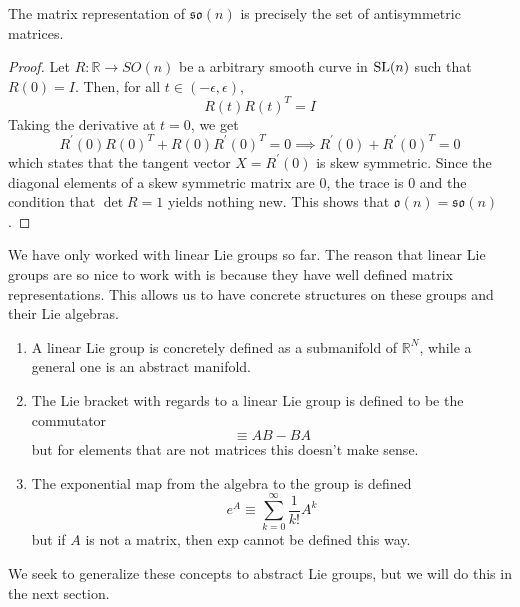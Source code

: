   \begin{theorem}
    The matrix representation of $\mathfrak{so}(n)$ is precisely the set of antisymmetric matrices. 
  \end{theorem}
  \begin{proof}
    Let $R: \mathbb{R} \rightarrow SO(n)$ be a arbitrary smooth curve in $\operatorname{SL}(n)$ such that $R(0) = I$. Then, for all $t \in (-\epsilon, \epsilon)$, 
    \begin{equation}
      R(t) R(t)^T = I
    \end{equation}
    Taking the derivative at $t = 0$, we get
    \begin{equation}
      R^\prime (0) R(0)^T + R(0) R^\prime(0)^T = 0 \implies R^\prime (0) + R^\prime(0)^T = 0
    \end{equation}
    which states that the tangent vector $X = R^\prime (0)$ is skew symmetric. Since the diagonal elements of a skew symmetric matrix are $0$, the trace is $0$ and the condition that $\det{R} = 1$ yields nothing new. This shows that $\mathfrak{o}(n) = \mathfrak{so}(n)$. 
  \end{proof}




  We have only worked with linear Lie groups so far. The reason that linear Lie groups are so nice to work with is because they have well defined matrix representations. This allows us to have concrete structures on these groups and their Lie algebras. 
  \begin{enumerate}
    \item A linear Lie group is concretely defined as a submanifold of $\mathbb{R}^N$, while a general one is an abstract manifold. 
    \item The Lie bracket with regards to a linear Lie group is defined to be the commutator 
      \begin{equation}
        [A,B] \equiv A B - B A
      \end{equation}
    but for elements that are not matrices this doesn't make sense. 

    \item The exponential map from the algebra to the group is defined
      \begin{equation}
        e^A \equiv \sum_{k=0}^\infty \frac{1}{k!} A^k
      \end{equation}
    but if $A$ is not a matrix, then exp cannot be defined this way.
  \end{enumerate}
  We seek to generalize these concepts to abstract Lie groups, but we will do this in the next section. 

